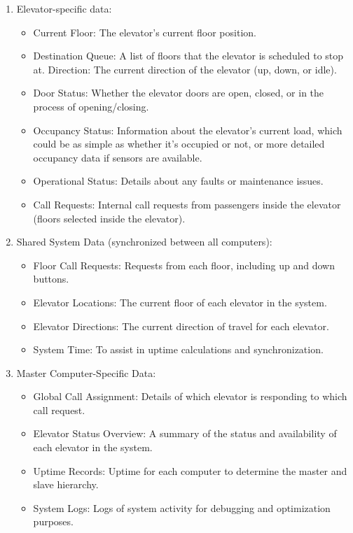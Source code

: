 \begin{enumerate}
    \item Elevator-specific data:
    \begin{itemize}
        \item Current Floor: The elevator's current floor position.
        \item Destination Queue: A list of floors that the elevator is scheduled to stop at.
        Direction: The current direction of the elevator (up, down, or idle).
        \item Door Status: Whether the elevator doors are open, closed, or in the process of opening/closing.
        \item Occupancy Status: Information about the elevator's current load, which could be as simple as whether it's occupied or not, or more detailed occupancy data if sensors are available.
        \item Operational Status: Details about any faults or maintenance issues.
        \item Call Requests: Internal call requests from passengers inside the elevator (floors selected inside the elevator).
    \end{itemize}
    \item Shared System Data (synchronized between all computers):
    \begin{itemize}
        \item Floor Call Requests: Requests from each floor, including up and down buttons.
        \item Elevator Locations: The current floor of each elevator in the system.
        \item Elevator Directions: The current direction of travel for each elevator.
        \item System Time: To assist in uptime calculations and synchronization.
    \end{itemize}
    \item Master Computer-Specific Data:
    \begin{itemize}
        \item Global Call Assignment: Details of which elevator is responding to which call request.
        \item Elevator Status Overview: A summary of the status and availability of each elevator in the system.
        \item Uptime Records: Uptime for each computer to determine the master and slave hierarchy.
        \item System Logs: Logs of system activity for debugging and optimization purposes.

\end{itemize}
\end{enumerate}
